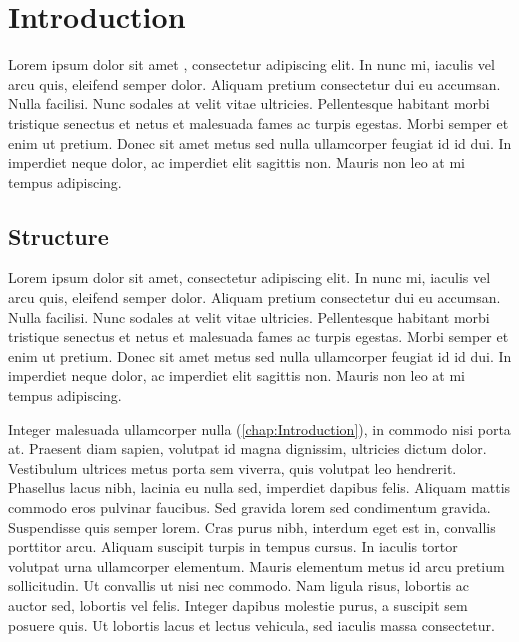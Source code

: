

\chapter{Introduction}
\label{chap:Introduction}
\PartialToc %

Lorem ipsum dolor sit amet \cite{Name2014}, consectetur adipiscing elit. In nunc mi, iaculis vel arcu quis, eleifend semper dolor. Aliquam pretium consectetur dui eu accumsan. Nulla facilisi. Nunc sodales at velit vitae ultricies. Pellentesque habitant morbi tristique senectus et netus et malesuada fames ac turpis egestas. Morbi semper et enim ut pretium. Donec sit amet metus sed nulla ullamcorper feugiat id id dui. In imperdiet neque dolor, ac imperdiet elit sagittis non. Mauris non leo at mi tempus adipiscing. 


\section{Structure}

 Lorem ipsum dolor sit amet, consectetur adipiscing elit. In nunc mi, iaculis vel arcu quis, eleifend semper dolor. Aliquam pretium consectetur dui eu accumsan. Nulla facilisi. Nunc sodales at velit vitae ultricies. Pellentesque habitant morbi tristique senectus et netus et malesuada fames ac turpis egestas. Morbi semper et enim ut pretium. Donec sit amet metus sed nulla ullamcorper feugiat id id dui. In imperdiet neque dolor, ac imperdiet elit sagittis non. Mauris non leo at mi tempus adipiscing.

Integer malesuada ullamcorper nulla (\autoref{chap:Introduction}), in commodo nisi porta at. Praesent diam sapien, volutpat id magna dignissim, ultricies dictum dolor. Vestibulum ultrices metus porta sem viverra, quis volutpat leo hendrerit. Phasellus lacus nibh, lacinia eu nulla sed, imperdiet dapibus felis. Aliquam mattis commodo eros pulvinar faucibus. Sed gravida lorem sed condimentum gravida. Suspendisse quis semper lorem. Cras purus nibh, interdum eget est in, convallis porttitor arcu. Aliquam suscipit turpis in tempus cursus. In iaculis tortor volutpat urna ullamcorper elementum. Mauris elementum metus id arcu pretium sollicitudin. Ut convallis ut nisi nec commodo. Nam ligula risus, lobortis ac auctor sed, lobortis vel felis. Integer dapibus molestie purus, a suscipit sem posuere quis. Ut lobortis lacus et lectus vehicula, sed iaculis massa consectetur. 

